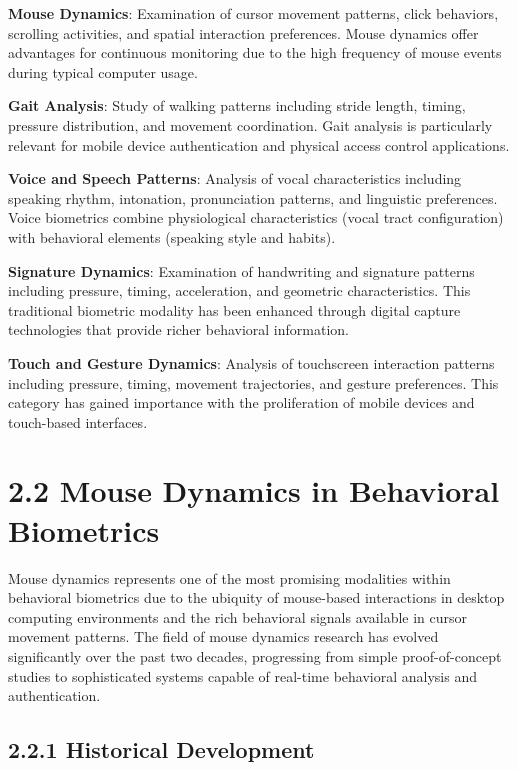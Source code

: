 \documentclass[
  12pt,
  a4paper,
]{report}
\begin{document}
\textbf{Mouse Dynamics}: Examination of cursor movement patterns, click
behaviors, scrolling activities, and spatial interaction preferences.
Mouse dynamics offer advantages for continuous monitoring due to the
high frequency of mouse events during typical computer usage.

\textbf{Gait Analysis}: Study of walking patterns including stride
length, timing, pressure distribution, and movement coordination. Gait
analysis is particularly relevant for mobile device authentication and
physical access control applications.

\textbf{Voice and Speech Patterns}: Analysis of vocal characteristics
including speaking rhythm, intonation, pronunciation patterns, and
linguistic preferences. Voice biometrics combine physiological
characteristics (vocal tract configuration) with behavioral elements
(speaking style and habits).

\textbf{Signature Dynamics}: Examination of handwriting and signature
patterns including pressure, timing, acceleration, and geometric
characteristics. This traditional biometric modality has been enhanced
through digital capture technologies that provide richer behavioral
information.

\textbf{Touch and Gesture Dynamics}: Analysis of touchscreen interaction
patterns including pressure, timing, movement trajectories, and gesture
preferences. This category has gained importance with the proliferation
of mobile devices and touch-based interfaces.

\section{2.2 Mouse Dynamics in Behavioral
Biometrics}\label{mouse-dynamics-in-behavioral-biometrics}

Mouse dynamics represents one of the most promising modalities within
behavioral biometrics due to the ubiquity of mouse-based interactions in
desktop computing environments and the rich behavioral signals available
in cursor movement patterns. The field of mouse dynamics research has
evolved significantly over the past two decades, progressing from simple
proof-of-concept studies to sophisticated systems capable of real-time
behavioral analysis and authentication.

\subsection{2.2.1 Historical Development}\label{historical-development}
\end{document}
